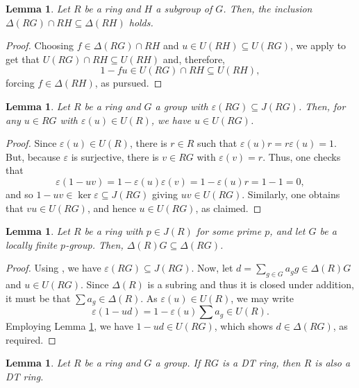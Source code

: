 \documentclass[12pt]{amsart}
\newtheorem{lemma}[theorem]{Lemma}
\theoremstyle{definition}
\begin{document}
\begin{lemma}\label{Delta(RG) subset Delta(RH)}
Let $R$ be a ring and $H$ a subgroup of $G$. Then, the inclusion $\Delta(RG) \cap RH \subseteq \Delta(RH)$ holds.
\end{lemma}

\begin{proof}
Choosing $f \in \Delta(RG) \cap RH$ and $u \in U(RH) \subseteq U(RG)$, we apply \cite[Proposition 4(i)]{coon} to get that $U(RG) \cap RH \subseteq U(RH)$ and, therefore,
\[
1 - fu \in U(RG) \cap RH \subseteq U(RH),
\]
forcing $f \in \Delta(RH)$, as pursued.
\end{proof}

\begin{lemma}\label{u in U(RG)}
Let $R$ be a ring and $G$ a group with $\varepsilon(RG) \subseteq J(RG)$. Then, for any $u \in RG$ with $\varepsilon(u) \in U(R)$, we have $u \in U(RG)$.
\end{lemma}

\begin{proof}
Since $\varepsilon(u) \in U(R)$, there is $r \in R$ such that $\varepsilon(u)r = r\varepsilon(u) = 1$. But, because $\varepsilon$ is surjective, there is $v \in RG$ with $\varepsilon(v) = r$. Thus, one checks that
\[
\varepsilon(1-uv) = 1 - \varepsilon(u)\varepsilon(v) = 1 - \varepsilon(u)r = 1-1 = 0,
\]
and so $1-uv \in \ker\varepsilon \subseteq J(RG)$ giving $uv \in U(RG)$. Similarly, one obtains that $vu \in U(RG)$, and hence $u \in U(RG)$, as claimed.
\end{proof}

\begin{lemma}\label{Delta(R) subset Delta(RG)}
Let $R$ be a ring with $p \in J(R)$ for some prime $p$, and let $G$ be a locally finite $p$-group. Then, $\Delta(R)G \subseteq \Delta(RG)$.
\end{lemma}

\begin{proof}
Using \cite[Lemma 2]{zhoucl}, we have $\varepsilon(RG) \subseteq J(RG)$. Now, let $d = \sum_{g \in G} a_g g \in \Delta(R)G$ and $u \in U(RG)$. Since $\Delta(R)$ is a subring and thus it is closed under addition, it must be that $\sum a_g \in \Delta(R)$. As $\varepsilon(u) \in U(R)$, we may write
\[
\varepsilon(1-ud) = 1 - \varepsilon(u)\sum a_g \in U(R).
\]
Employing Lemma \ref{u in U(RG)}, we have $1-ud \in U(RG)$, which shows $d \in \Delta(RG)$, as required.
\end{proof}

\begin{lemma}\label{RG gdt then R is so}
Let $R$ be a ring and $G$ a group. If $RG$ is a DT ring, then $R$ is also a DT ring.
\end{lemma}
\end{document}
